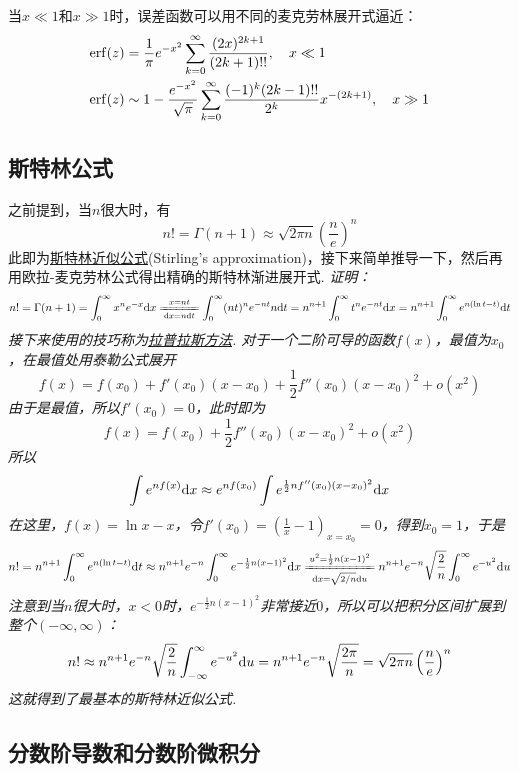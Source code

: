 \documentclass[UTF8]{ctexart}
\newcommand{\trm}[1]{{\rm #1}}
\begin{document}
当\(x\ll1\)和\(x\gg1\)时，误差函数可以用不同的麦克劳林展开式逼近：
\begin{align*}
    \trm{erf}(z) &= \frac{1}{\pi}e^{-x^2} \sum_{k=0}^{\infty} \frac{(2x)^{2k+1}}{(2k+1)!!}, \quad x \ll 1 \\
    \trm{erf}(z) &\sim 1-\frac{e^{-x^2}}{\sqrt{\pi}}\sum_{k=0}^{\infty}\frac{(-1)^k(2k-1)!!}{2^k}x^{-(2k+1)}, \quad x \gg 1
\end{align*}

\subsection{斯特林公式}

之前提到，当\(n\)很大时，有
\[n! = \Gamma(n+1) \approx \sqrt{2\pi n}\left(\frac{n}{e}\right)^n\]
此即为\uline{斯特林近似公式}(Stirling's approximation)，接下来简单推导一下，然后再用欧拉-麦克劳林公式得出精确的斯特林渐进展开式.
\newline
\textit{证明：}
\[ n! = \Gamma(n+1) = \int_{0}^{\infty}x^{n}e^{-x}\trm{d}x \xlongequal[\trm{d}x=n\trm{d}t]{x = nt} \int_{0}^{\infty}(nt)^{n}e^{-nt}n\trm{d}t = n^{n+1}\int_{0}^{\infty}t^{n}e^{-nt}\trm{d}x = n^{n+1}\int_{0}^{\infty}e^{n(\ln t - t)}\trm{d}t\]
\textit{接下来使用的技巧称为\uline{拉普拉斯方法}. 对于一个二阶可导的函数\(f(x)\)，最值为\(x_0\)，在最值处用泰勒公式展开}
\[f(x) = f(x_0)+f'(x_0)(x-x_0)+\frac{1}{2}f''(x_0)(x-x_0)^2+o(x^2)\]
\textit{由于是最值，所以\(f'(x_0)=0\)，此时即为}
\[f(x) = f(x_0)+\frac{1}{2}f''(x_0)(x-x_0)^2+o(x^2)\]
\textit{所以}
\[\int e^{nf(x)}\trm{d}x \approx e^{nf(x_0)}\int e^{\frac{1}{2}nf''(x_0)(x-x_0)^2}\trm{d}x\]
\textit{在这里，\(f(x)=\ln x-x\)，令\(\displaystyle{f'(x_0)=\left(\frac{1}{x}-1\right)_{x=x_0}=0}\)，得到\(x_0=1\)，于是}
\[n! = n^{n+1}\int_{0}^{\infty}e^{n(\ln t - t)}\trm{d}t \approx n^{n+1}e^{-n}\int_{0}^{\infty}e^{-\frac{1}{2}n(x-1)^2}\trm{d}x \xlongequal[\trm{d}x=\sqrt{2/n}\trm{d}u]{u^2=\frac{1}{2}n(x-1)^2} n^{n+1}e^{-n}\sqrt{\frac{2}{n}}\int_{0}^{\infty}e^{-u^2}\trm{d}u\]
\textit{注意到当\(n\)很大时，\(x<0\)时，\(e^{-\frac{1}{2}n(x-1)^2}\)非常接近\(0\)，所以可以把积分区间扩展到整个\((-\infty, \infty)\)：}
\[n! \approx n^{n+1}e^{-n}\sqrt{\frac{2}{n}}\int_{-\infty}^{\infty}e^{-u^2}\trm{d}u = n^{n+1}e^{-n}\sqrt{\frac{2\pi}{n}} = \sqrt{2\pi n}\left(\frac{n}{e}\right)^n\]
\textit{这就得到了最基本的斯特林近似公式.}

\subsection{分数阶导数和分数阶微积分}
\end{document}
